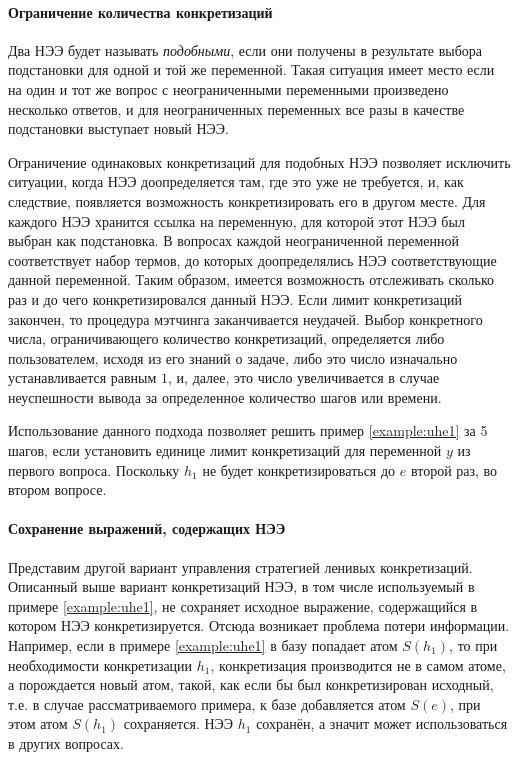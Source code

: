 \paragraph{Ограничение количества конкретизаций}
Два НЭЭ будет называть \emph{подобными}, если они получены в результате выбора подстановки для одной и той же переменной. Такая ситуация имеет место если на один и тот же вопрос с неограниченными переменными произведено несколько ответов, и для неограниченных переменных все разы в качестве подстановки выступает новый НЭЭ.

Ограничение одинаковых конкретизаций для подобных НЭЭ позволяет исключить ситуации, когда НЭЭ доопределяется там, где это уже не требуется, и, как следствие, появляется возможность конкретизировать его в другом месте. Для каждого НЭЭ хранится ссылка на переменную, для которой этот НЭЭ был выбран как подстановка. В вопросах каждой неограниченной переменной соответствует набор термов, до которых доопределялись НЭЭ соответствующие данной переменной. Таким образом, имеется возможность отслеживать сколько раз и до чего конкретизировался данный НЭЭ. Если лимит конкретизаций закончен, то процедура мэтчинга заканчивается неудачей. Выбор конкретного числа, ограничивающего количество конкретизаций, определяется либо пользователем, исходя из его знаний о задаче, либо это число изначально устанавливается равным $1$, и, далее, это число увеличивается в случае неуспешности вывода за определенное количество шагов или времени.

Использование данного подхода позволяет решить пример \ref{example:uhe1} за 5 шагов, если установить единице лимит конкретизаций для переменной $y$ из первого вопроса. Поскольку $h_1$ не будет конкретизироваться до $e$ второй раз, во втором вопросе.

\paragraph{Сохранение выражений, содержащих НЭЭ}
Представим другой вариант управления стратегией ленивых конкретизаций. Описанный выше вариант конкретизаций НЭЭ, в том числе используемый в примере \ref{example:uhe1}, не сохраняет исходное выражение, содержащийся в котором НЭЭ конкретизируется. Отсюда возникает проблема потери информации. Например, если в примере \ref{example:uhe1} в базу попадает атом $S(h_1)$, то при необходимости конкретизации $h_1$, конкретизация производится не в самом атоме, а порождается новый атом, такой, как если бы был конкретизирован исходный, т.е. в случае рассматриваемого примера, к базе добавляется атом $S(e)$, при этом атом $S(h_1)$ сохраняется. НЭЭ $h_1$ сохранён, а значит может использоваться в других вопросах.

